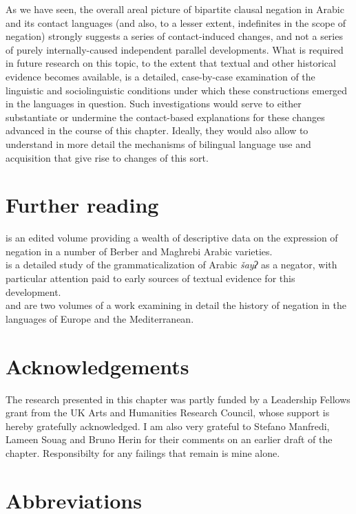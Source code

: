 \documentclass[output=paper]{langsci/langscibook}
\begin{document}
As we have seen, the overall areal picture of bipartite clausal negation in Arabic and its contact languages (and also, to a lesser extent, indefinites in the scope of negation) strongly suggests a series of contact-induced changes, and not a series of purely internally-caused independent parallel developments. What is required in future research on this topic, to the extent that textual and other historical evidence becomes available, is a detailed, case-by-case examination of the linguistic and sociolinguistic conditions under which these constructions emerged in the languages in question. Such investigations would serve to either substantiate or undermine the contact-based explanations for these changes advanced in the course of this chapter. Ideally, they would also allow to understand in more detail the mechanisms of bilingual language use and acquisition that give rise to changes of this sort. 

\section*{Further reading}

\citet{ChakerCaubet1996} is an edited volume providing a wealth of descriptive data on the expression of negation in a number of Berber and Maghrebi Arabic varieties.\\
\citet{Diem2014} is a detailed study of the grammaticalization of Arabic \textit{šayʔ} as a negator, with particular attention paid to early sources of textual evidence for this development.\\
\citet{WillisBreitbarth2013} and \citet{BreitbarthWillisLucasinpress} are two volumes of a work examining in detail the history of negation in the languages of Europe and the Mediterranean.

\section*{Acknowledgements}

The research presented in this chapter was partly funded by a Leadership Fellows grant from the UK Arts and Humanities Research Council, whose support is hereby gratefully acknowledged. I am also very grateful to Stefano Manfredi, Lameen Souag and Bruno Herin for their comments on an earlier draft of the chapter. Responsibilty for any failings that remain is mine alone.

\section*{Abbreviations}
\end{document}
